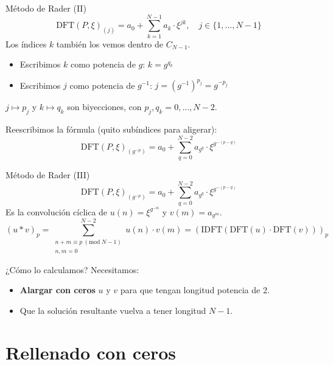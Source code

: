 \documentclass[spanish]{beamer}
\newcommand{\DFT}{\text{DFT}}
\newcommand{\IDFT}{\text{IDFT}}
\begin{document}
\begin{frame}{Método de Rader (II)}
    \begin{equation*}
        \DFT(P,\xi)_{(j)}=a_0+\sum\limits_{k=1}^{N-1} a_k \cdot\xi^{jk},\quad j\in\{1,...,N-1\}
    \end{equation*}
    Los índices $k$ también los vemos dentro de $C_{N-1}$.\\[\smallskipamount]
    \begin{itemize}
        \item Escribimos $k$ como potencia de $g$:\qquad
            $k=g^{q_k}$
        \item Escribimos $j$ como potencia de $g^{-1}$:\qquad 
            $j=(g^{-1})^{p_j}=g^{-p_j}$
    \end{itemize}\medskip
    
    $j\mapsto p_j$ y $k\mapsto q_k$ son biyecciones, con $p_j,q_k = 0,...,N-2$.\bigskip
    
    Reescribimos la fórmula (quito subíndices para aligerar):
    \begin{equation*}
        \DFT(P,\xi)_{(g^{-p})}=a_0+\sum_{q=0}^{N-2} a_{g^{q}} \cdot\xi^{g^{-(p-q)}}
    \end{equation*}
\end{frame}

\begin{frame}{Método de Rader (III)}
    \begin{equation*}
        \DFT(P,\xi)_{(g^{-p})}=a_0+\sum_{q=0}^{N-2} a_{g^{q}} \cdot\xi^{g^{-(p-q)}}
    \end{equation*}
    Es la convolución cíclica de $u(n) = \xi^{g^{-n}}$ y $v(m)=a_{g^m}$.
    \begin{equation*}
        (u*v)_p = \sum\limits_{\substack{n+m\equiv p\ (\text{mod}\ N-1)\\ n,m=0}}^{N-2}u(n)\cdot v(m)
        =(\IDFT\left(\DFT(u)\cdot\DFT(v)\right))_p
    \end{equation*}
    
    ¿Cómo lo calculamos? Necesitamos:
    \begin{itemize}
        \item \textbf{Alargar con ceros} $u$ y $v$ para que tengan longitud potencia de 2.
        \item Que la solución resultante vuelva a tener longitud $N-1$.
    \end{itemize} 
\end{frame}

\section{Rellenado con ceros}
\end{document}
